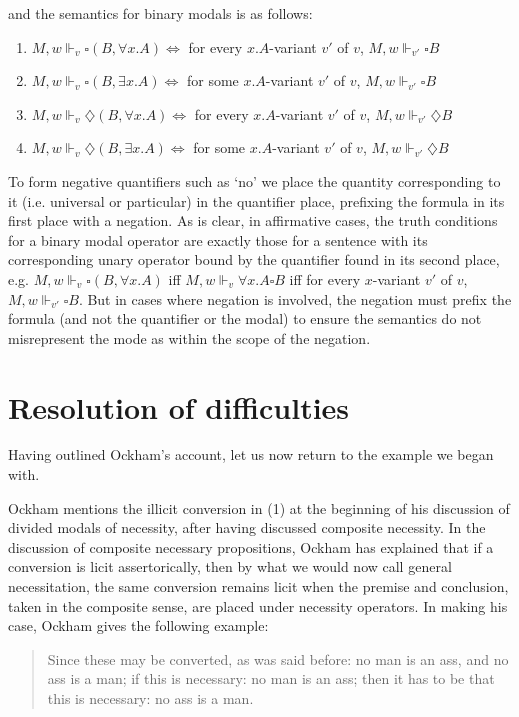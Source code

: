 \documentclass[a4paper]{article}
\begin{document}
and the semantics for binary modals is as follows: 
\begin{enumerate}
	\item $M, w \Vdash_{v} \square(B, \forall x.A) \Leftrightarrow$ for every $x.A$-variant $v'$ of $v$, $M, w \Vdash_{v'} \square B$
	\item $M, w \Vdash_{v} \square(B, \exists x.A) \Leftrightarrow$ for some $x.A$-variant $v'$ of $v$, $M, w \Vdash _{v'} \square B$
	\item $M, w \Vdash_{v} \diamondsuit(B, \forall x.A) \Leftrightarrow$ for every $x.A$-variant $v'$ of $v$, $M, w \Vdash_{v'} \diamondsuit B$
	\item $M, w \Vdash_{v} \diamondsuit(B, \exists x.A) \Leftrightarrow$ for some $x.A$-variant $v'$ of $v$, $M, w \Vdash _{v'} \diamondsuit B$
\end{enumerate}

To form negative quantifiers such as `no' we place the quantity corresponding to it (i.e. universal or particular) in the quantifier place, prefixing the formula in its first place with a negation. As is clear, in affirmative cases, the truth conditions for a binary modal operator are exactly those for a sentence with its corresponding unary operator bound by the quantifier found in its second place, e.g. $M, w \Vdash_{v} \square(B, \forall x.A)$ iff $M, w \Vdash_{v} \forall x.A \square B$ iff for every $x$-variant $v'$ of $v$, $M, w \Vdash_{v'} \square B$. But in cases where negation is involved, the negation must prefix the formula (and not the quantifier or the modal) to ensure the semantics do not misrepresent the mode as within the scope of the negation.
\section{Resolution of difficulties}
Having outlined Ockham's account, let us now return to the example we began with.

Ockham mentions the illicit conversion in (1) at the beginning of his discussion of divided modals of necessity, after having discussed composite necessity. In the discussion of composite necessary propositions, Ockham has explained that if a conversion is licit assertorically, then by what we would now call general necessitation, the same conversion remains licit when the premise and conclusion, taken in the composite sense, are placed under necessity operators. In making his case, Ockham gives the following example:

\begin{quote}
Since these may be converted, as was said before: no man is an ass, and no ass is a man; if this is necessary: no man is an ass; then it has to be that this is necessary: no ass is a man. \cite[II. 24, p. 296]{OckhamSL2} 
\end{quote}
\end{document}
